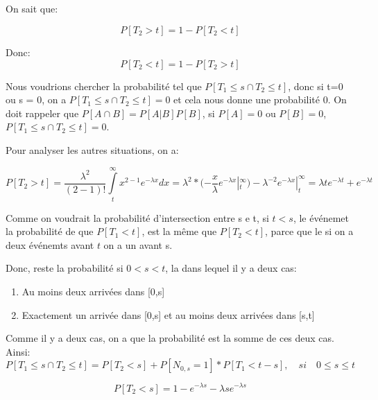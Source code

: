 \documentclass[a4paper]{article}
\begin{document}
\subsection{}

On sait que:

\begin{equation}
P[T_2 > t] =1 - P[T_2 < t]
\end{equation}

Donc:
\begin{equation}
P[T_2 < t] =1 - P[T_2 > t]
\end{equation}

Nous voudrions  chercher la probabilité tel  que $P[T_1\leq s  \cap T_2\leq t]$,
donc si t=0 ou s = 0, on a $P[{T_1  \leq s} \cap {T_2 \leq t}] = 0$ et cela nous
donne une  probabilité 0.  On doit  rappeler que $P[A  \cap B]=P[A|B]P[B]  $, si
$P[A]=0$ ou $P[B]=0$, $P[{T_1  \leq s} \cap {T_2 \leq t}] = 0$.

Pour analyser les autres situations, on a:

\begin{equation*}
P[T_2 > t] = \frac{\lambda ^2}{(2 - 1)!}\int\limits_t^\infty{x^{2-1}}e^{-\lambda x}dx= \lambda ^2 *(-\frac{x}{\lambda} e^{-\lambda x} |_t^\infty)- \lambda^{-2} e^{-\lambda x}|_t^\infty = \lambda te^{-\lambda t} + e^{-\lambda t}
\end{equation*}

Comme  on voudrait  la probabilité  d'intersection  entre s  e t,  si $t<s$,  le
événemet la probabilité  de que $P[T_1 <t]$, est la même  que $P[T_2 <t]$, parce
que le si on a deux événemts avant $t$ on a un avant s.

Donc, reste la probabilité si $0<s<t$, la dans lequel il y a deux cas:
\begin{enumerate}
\item Au moins deux arrivées dans [0,s]
\item Exactement un arrivée dans [0,s] et au moins deux arrivées dans [s,t]
\end{enumerate}

Comme il y a deux cas, on a que la probabilité est la somme de ces deux cas.
Ainsi:
\begin{equation}
P[{T_1 \leq s} \cap {T_2 \leq t}] = P[T_2 < s] + P[N_{0,s}=1]*P[T_1<t-s], \quad si 
\quad 0
\leq s \leq t
\end{equation}

\begin{equation*}
P[T_2 < s]= 1 - e^{-\lambda s}- \lambda s e^{-\lambda s}
\end{equation*}
\end{document}
